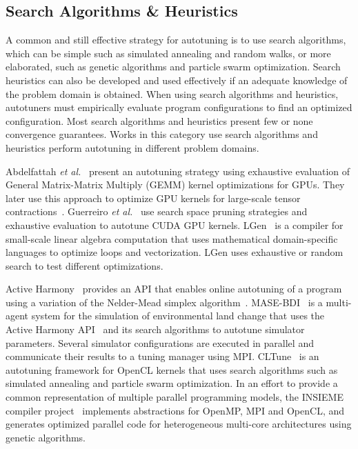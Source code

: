 \subsection{Search Algorithms \& Heuristics}

A common and still effective strategy for autotuning is to use search
algorithms, which can be simple such as simulated annealing and random walks,
or more elaborated, such as genetic algorithms and particle swarm optimization.
Search heuristics can also be developed and used effectively if an adequate
knowledge of the problem domain is obtained. When using search algorithms and
heuristics, autotuners must empirically evaluate program configurations to find
an optimized configuration. Most search algorithms and heuristics present few
or none convergence guarantees. Works in this category use search
algorithms and heuristics perform autotuning in different problem domains.

Abdelfattah \emph{et al.}~\cite{abdelfattah2016performance} present an
autotuning strategy using exhaustive evaluation of General Matrix-Matrix
Multiply (GEMM) kernel optimizations for GPUs. They later use this approach to
optimize GPU kernels for large-scale tensor
contractions~\cite{abdelfattah2016high}.  Guerreiro \emph{et
al.}~\cite{guerreiro2015multi} use search space pruning strategies and
exhaustive evaluation to autotune CUDA GPU kernels.
LGen~\cite{spampinato2014basic} is a compiler for small-scale linear algebra
computation that uses mathematical domain-specific languages to optimize loops
and vectorization. LGen uses exhaustive or random search to test different
optimizations.

Active Harmony~\cite{tapus2002active} provides an API that enables online
autotuning of a program using a variation of the Nelder-Mead simplex
algorithm~\cite{nelder1965simplex}.  MASE-BDI~\cite{coelho2016mase} is a
multi-agent system for the simulation of environmental land change that uses
the Active Harmony API~\cite{tapus2002active} and its search algorithms to
autotune  simulator parameters.  Several simulator configurations are executed
in parallel and communicate their results to a tuning manager using MPI.
CLTune~\cite{nugteren2015cltune} is an autotuning framework for OpenCL kernels
that uses search algorithms such as simulated annealing and particle swarm
optimization.  In an effort to provide a common representation of multiple
parallel programming models, the INSIEME compiler
project~\cite{jordan2012multi} implements abstractions for OpenMP, MPI and
OpenCL, and generates optimized parallel code for heterogeneous multi-core
architectures using genetic algorithms.

